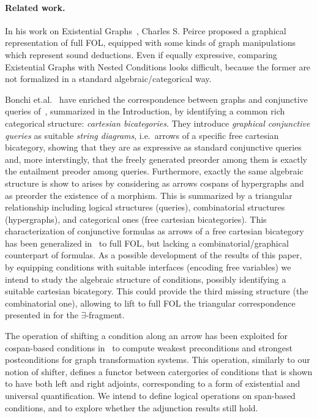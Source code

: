 
\paragraph{Related work.}

In his work on Existential Graphs~\cite{roberts1973-the-existential-graphs-of-charles-s.-peirce}, Charles S. Peirce proposed a graphical representation of full FOL, equipped with some kinds of graph manipulations which represent sound deductions. Even if equally expressive, comparing Existential Graphs with Nested Conditions looks difficult, because the former are not formalized in a standard algebraic/categorical way.

Bonchi et.al.~\cite{DBLP:conf/csl/BonchiSS18} have enriched the correspondence between graphs and conjunctive queries of~\cite{DBLP:conf/stoc/ChandraM77}, summarized in the Introduction,  by identifying a common rich categorical structure: \emph{cartesian bicategories}. They introduce \emph{graphical conjunctive queries} as suitable \emph{string diagrams}, i.e.~arrows of a specific free cartesian bicategory, showing that they are as expressive as standard conjunctive queries and, more interstingly, that the freely generated preorder among them is exactly the entailment preoder among queries. Furthermore, exactly the same algebraic structure is show to arises by considering as arrows cospans of hypergraphs and as preorder the existence of a morphism. This is summarized by a triangular relationship including logical structures (queries), combinatorial structures (hypergraphs), and categorical ones (free cartesian bicategories).  This characterization of conjunctive formulas as arrows of a free cartesian bicategory has been generalized in~\cite{DBLP:journals/corr/abs-2404-18795} to full FOL, but lacking a combinatorial/graphical counterpart of formulas. As a possible development of the results of this paper, by equipping conditions with suitable interfaces (encoding free variables) we intend to study the algebraic structure of conditions, possibly identifying a suitable cartesian bicategory.  This could provide the third missing structure (the combinatorial one), allowing to lift to full FOL the triangular correspondence presented in \cite{DBLP:conf/csl/BonchiSS18} for the $\exists$-fragment.


The operation of shifting a condition along an arrow has been exploited for cospan-based conditions in~\cite{bchk:conditional-reactive-systems} to compute weakest preconditions and strongest postconditions for graph transformation systems. This operation, similarly to our notion of shifter, defines a functor between catergories of conditions that is shown to have both left and right adjoints, corresponding to a form of existential and universal quantification.  We intend to define logical operations on span-based conditions, and to explore whether the adjunction results still hold.


